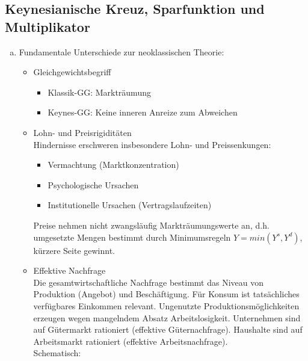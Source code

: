 \documentclass{scrartcl}
\begin{document}
\subsection{Keynesianische Kreuz, Sparfunktion und Multiplikator}
\begin{enumerate}[(a)]
\item Fundamentale Unterschiede zur neoklassischen Theorie:
\begin{itemize}
\item Gleichgewichtsbegriff
\begin{itemize}
  \item Klassik-GG: Marktr\"{a}umung
  \item Keynes-GG: Keine inneren Anreize zum Abweichen
\end{itemize}
\item Lohn- und Preisrigidit\"{a}ten\\
Hindernisse erschweren insbesondere Lohn- und Preissenkungen:
    \begin{itemize}
      \item Vermachtung (Marktkonzentration)
      \item Psychologische Ursachen
      \item Institutionelle Ursachen (Vertragslaufzeiten)
    \end{itemize}
    Preise nehmen nicht zwangsl\"{a}ufig Marktr\"{a}umungswerte an, d.h. umgesetzte Mengen bestimmt durch Minimumsregeln $Y=min(Y^s,Y^d)$, k\"{u}rzere Seite gewinnt.
\item Effektive Nachfrage\\
    Die gesamtwirtschaftliche Nachfrage bestimmt das Niveau von Produktion (Angebot) und Besch\"{a}ftigung. F\"{u}r Konsum ist tats\"{a}chliches verf\"{u}gbares Einkommen relevant. Ungenutzte Produktionsm\"{o}glichkeiten erzeugen
wegen mangelndem Absatz Arbeitslosigkeit. Unternehmen sind auf G\"{u}termarkt rationiert (effektive G\"{u}ternachfrage). Haushalte sind auf Arbeitsmarkt rationiert (effektive Arbeitsnachfrage).\\Schematisch:\\

\end{itemize}
\end{enumerate}
\end{document}
